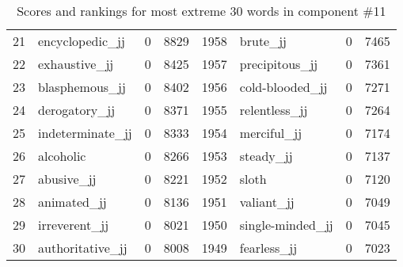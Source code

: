 \begin{table}[tbp]
\begin{tabular}{| rlr@{.}l | rlr@{.}l |}
    21 & encyclopedic\_jj & 0 & 8829    &    1958 & brute\_jj & 0 & 7465 \\
    22 & exhaustive\_jj & 0 & 8425    &    1957 & precipitous\_jj & 0 & 7361 \\
    23 & blasphemous\_jj & 0 & 8402    &    1956 & cold-blooded\_jj & 0 & 7271 \\
    24 & derogatory\_jj & 0 & 8371    &    1955 & relentless\_jj & 0 & 7264 \\
    25 & indeterminate\_jj & 0 & 8333    &    1954 & merciful\_jj & 0 & 7174 \\
    26 & alcoholic & 0 & 8266    &    1953 & steady\_jj & 0 & 7137 \\
    27 & abusive\_jj & 0 & 8221    &    1952 & sloth & 0 & 7120 \\
    28 & animated\_jj & 0 & 8136    &    1951 & valiant\_jj & 0 & 7049 \\
    29 & irreverent\_jj & 0 & 8021    &    1950 & single-minded\_jj & 0 & 7045 \\
    30 & authoritative\_jj & 0 & 8008    &    1949 & fearless\_jj & 0 & 7023 \\
    \hline
    \end{tabular}
    \caption{Scores and rankings for most extreme 30 words in component \#11} 
\end{table}
\clearpage
